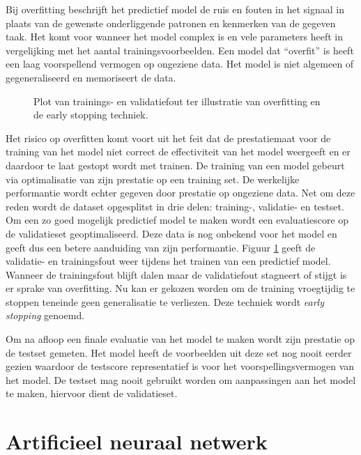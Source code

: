 \npar Bij overfitting beschrijft het predictief model de ruis en fouten in het signaal in plaats van de gewenste onderliggende patronen en kenmerken van de gegeven taak. Het komt voor wanneer het model complex is en vele parameters heeft in vergelijking met het aantal trainingsvoorbeelden. Een model dat ``overfit'' is heeft een laag voorspellend vermogen op ongeziene data. Het model is niet algemeen of gegeneraliseerd en  memoriseert de data. 

\begin{figure}
	\centering
	\def\svgscale{0.7}
	
	\caption{Plot van trainings- en validatiefout ter illustratie van overfitting en de early stopping techniek.}
	\label{fig:overfitting}
\end{figure}

\npar Het risico op overfitten komt voort uit het feit dat de prestatiemaat voor de training van het model niet correct de effectiviteit van het model weergeeft en er daardoor te laat gestopt wordt met trainen. De training van een model gebeurt via optimalisatie van zijn prestatie op een training set. De werkelijke performantie wordt echter gegeven door prestatie op ongeziene data. Net om deze reden wordt de dataset opgesplitst in drie delen: training-, validatie- en testset.
\npar Om een zo goed mogelijk predictief model te maken wordt een evaluatiescore op de validatieset geoptimaliseerd. Deze data is nog onbekend voor het model en geeft dus een betere aanduiding van zijn performantie. Figuur \ref{fig:overfitting} geeft de validatie- en trainingsfout weer tijdens het trainen van een predictief model. Wanneer de trainingsfout blijft dalen maar de validatiefout stagneert of stijgt is er sprake van overfitting. Nu kan er gekozen worden om de training vroegtijdig te stoppen teneinde geen generalisatie te verliezen. Deze techniek wordt \textit{early stopping} genoemd.

\npar Om na afloop een finale evaluatie van het model te maken wordt zijn prestatie op de testset gemeten. Het model heeft de voorbeelden uit deze set nog nooit eerder gezien waardoor de testscore representatief is voor het voorspellingsvermogen van het model. De testset mag nooit gebruikt worden om aanpassingen aan het model te maken, hiervoor dient de validatieset.

\section{Artificieel neuraal netwerk}\label{sec:ann}
